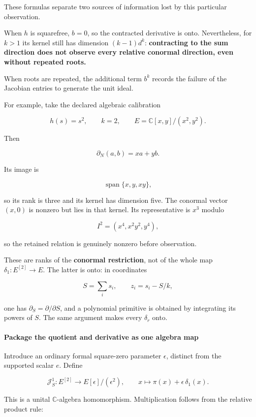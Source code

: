 These formulas separate two sources of information lost by this particular observation.

When \(h\) is squarefree, \(b=0\), so the contracted derivative is onto. Nevertheless, for \(k>1\)
its kernel still has dimension \((k-1)d^k\): \textbf{contracting to the sum direction does not
observe every relative conormal direction, even without repeated roots.}

When roots are repeated, the additional term \(b^k\) records the failure of the Jacobian entries to
generate the unit ideal.

For example, take the declared algebraic calibration

\[
h(s)=s^2,\qquad k=2,\qquad
E=\mathbb C[x,y]/(x^2,y^2).
\]

Then

\[
\partial_N(a,b)=xa+yb.
\]

Its image is

\[
\operatorname{span}\{x,y,xy\},
\]

so its rank is three and its kernel has dimension five. The conormal vector \((x,0)\) is nonzero but
lies in that kernel. Its representative is \(x^3\) modulo

\[
I^2=(x^4,x^2y^2,y^4),
\]

so the retained relation is genuinely nonzero before observation.

These are ranks of the \textbf{conormal restriction}, not of the whole map
\(\delta_1:E^{[2]}\to E\). The latter is onto: in coordinates

\[
S=\sum_i s_i,\qquad z_i=s_i-S/k,
\]

one has \(\partial_S=\partial/\partial S\), and a polynomial primitive is obtained by integrating
its powers of \(S\). The same argument makes every \(\delta_r\) onto.

\paragraph{Package the quotient and derivative as one algebra
map}\label{conormal_tower_pasted:package-the-quotient-and-derivative-as-one-algebra-map}

Introduce an ordinary formal square-zero parameter \(\epsilon\), distinct from the supported scalar
\(e\). Define

\[
\boxed{
\mathcal J_S^1:E^{[2]}
\longrightarrow E[\epsilon]/(\epsilon^2),
\qquad
x\longmapsto\pi(x)+\epsilon\,\delta_1(x).
}
\]

This is a unital \(\mathbb C\)-algebra homomorphism. Multiplication follows from the relative
product rule:

